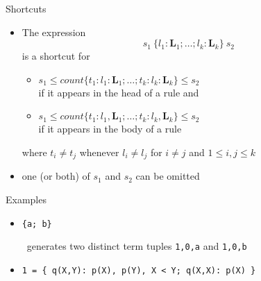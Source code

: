 \begin{frame}{Shortcuts}
  \begin{itemize}
  \item The expression
    \[
    s_1~\{ l_1:\boldsymbol{L}_1;\dots;l_k:\boldsymbol{L}_k\}~s_2
    \]
    is a shortcut for

    \begin{itemize}
    \item 
      \(
      s_1\leq\mathit{count}\{t_1:l_1:\boldsymbol{L}_1;\dots;t_k:l_k:\boldsymbol{L}_k\}\leq s_2
      \)
      \\\smallskip
      if it appears in the head of a rule and
      \\\medskip
    \item 
      \(
      s_1\leq\mathit{count}\{t_1:l_1,\boldsymbol{L}_1;\dots;t_k:l_k,\boldsymbol{L}_k\}\leq s_2
      \)
      \\\smallskip
      if it appears in the body of a rule
    \end{itemize}
    where $t_i\neq t_j$ whenever $l_i\neq l_j$ for $i\neq j$ and $1\leq i,j\leq k$
  \item<2->  one (or both) of $s_1$ and $s_2$ can be omitted 
  \end{itemize}
\end{frame}
\begin{frame}[fragile]{Examples}
  \begin{itemize}
  \item<2-> \texttt{\{a; b\}}

\begin{semiverbatim}
\end{semiverbatim}
\pause[4]
\gringo\ generates two distinct term tuples \lstinline{1,0,a} and \lstinline{1,0,b}
\medskip
  \item<5-> \texttt{1 = \{ q(X,Y): p(X), p(Y), X < Y; q(X,X): p(X) \}}
  \end{itemize}
\end{frame}
